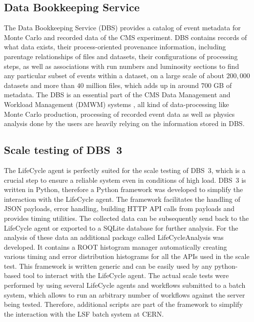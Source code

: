 \subsection{Data Bookkeeping Service}
The Data Bookkeeping Service (DBS) \cite{DBS} provides a catalog of event metadata for Monte Carlo and recorded data of the CMS experiment. DBS contains records of what data exists, their process-oriented provenance information, including parentage relationships of files and datasets, their configurations of processing steps, as well as associations with run numbers and luminosity sections to find any particular subset of events within a dataset, on a large scale of about $200,000$ datasets and more than $40$ million files, which adds up in around $700$ GB of metadata. The DBS is an essential part of the CMS Data Management and Workload Management (DMWM) systems \cite{DMWM}, all kind of data-processing like Monte Carlo production, processing of recorded event data as well as physics analysis done by the users are heavily relying on the information stored in DBS.

\subsection{Scale testing of DBS~3}
The LifeCycle agent is perfectly suited for the scale testing of DBS~3, which is a crucial step to ensure a reliable system even in conditions of high load. DBS~3 is written in Python, therefore a Python framework was developed to simplify the interaction with the LifeCycle agent. The framework facilitates the handling of JSON payloads, error handling, building HTTP API calls from payloads and provides timing utilities. The collected data can be subsequently send back to the LifeCycle agent or exported to a SQLite database for further analysis. For the analysis of these data an additional package called LifeCycleAnalysis was developed. It contains a ROOT histogram manager automatically creating various timing and error distribution histograms for all the APIs used in the scale test. This framework is written generic and can be easily used by any python-based tool to interact with the LifeCycle agent. The actual scale tests were performed by using several LifeCycle agents and workflows submitted to a batch system, which allows to run an arbitrary number of workflows against the server being tested. Therefore, additional scripts are part of the framework to simplify the interaction with the LSF batch system at CERN.
